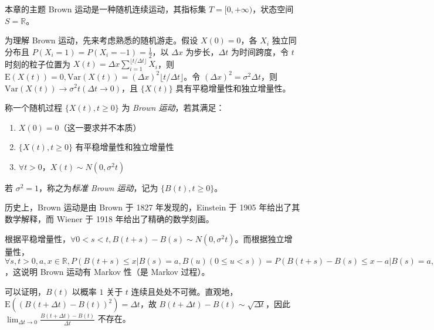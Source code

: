 \documentclass[../main.tex]{subfiles}
\begin{document}
本章的主题 Brown 运动是一种随机连续运动，其指标集 $T=[0,+\infty)$，状态空间 $S=\mathbb R$。

为理解 Brown 运动，先来考虑熟悉的随机游走。假设 $X(0)=0$，各 $X_i$ 独立同分布且 $P(X_i=1)=P(X_i=-1)=\frac12$，以 $\Delta x$ 为步长，$\Delta t$ 为时间跨度，令 $t$ 时刻的粒子位置为 $X(t)=\Delta x\sum_{i=1}^{\lfloor t/\Delta t\rfloor}X_i$，则 $\mathrm E(X(t))=0,\mathrm{Var}(X(t))=(\Delta x)^2\lfloor t/\Delta t\rfloor$。令 $(\Delta x)^2=\sigma^2\Delta t$，则 $\mathrm{Var}(X(t))\rightarrow \sigma^2t(\Delta t\rightarrow0)$，且 $\{X(t)\}$ 具有平稳增量性和独立增量性。

\begin{definition}\label{def:8.1.1}
    称一个随机过程 $\{X(t),t\geq 0\}$ 为 \emph{Brown 运动}，若其满足：
    \begin{enumerate}
        \item $X(0)=0$（这一要求并不本质）
        \item $\{X(t),t\geq 0\}$ 有平稳增量性和独立增量性
        \item $\forall t>0$，$X(t)\sim N(0,\sigma^2t)$
    \end{enumerate}
    若 $\sigma^2=1$，称之为\emph{标准 Brown 运动}，记为 $\{B(t),t\geq0\}$。
\end{definition}

历史上，Brown 运动是由 Brown 于 1827 年发现的，Einstein 于 1905 年给出了其数学解释，而 Wiener 于 1918 年给出了精确的数学刻画。

根据平稳增量性，$\forall0<s<t,B(t+s)-B(s)\sim N(0,\sigma^2t)$。而根据独立增量性，$\forall s,t>0,a,x\in\mathbb R,P(B(t+s)\leq x|B(s)=a,B(u)(0\leq u<s))=P(B(t+s)-B(s)\leq x-a|B(s)=a,B(u)(0\leq u<s))=P(B(t+s)-B(s)\leq x-a)=P(B(t+s)\leq x|B(s)=a)$，这说明 Brown 运动有 Markov 性（是 Markov 过程）。

可以证明，$B(t)$ 以概率 $1$ 关于 $t$ 连续且处处不可微。直观地，$\mathrm E((B(t+\Delta t)-B(t))^2)=\Delta t$，故 $B(t+\Delta t)-B(t)\sim\sqrt{\Delta t}$，因此 $\lim_{\Delta t\rightarrow0}\frac{B(t+\Delta t)-B(t)}{\Delta t}$ 不存在。
\end{document}
